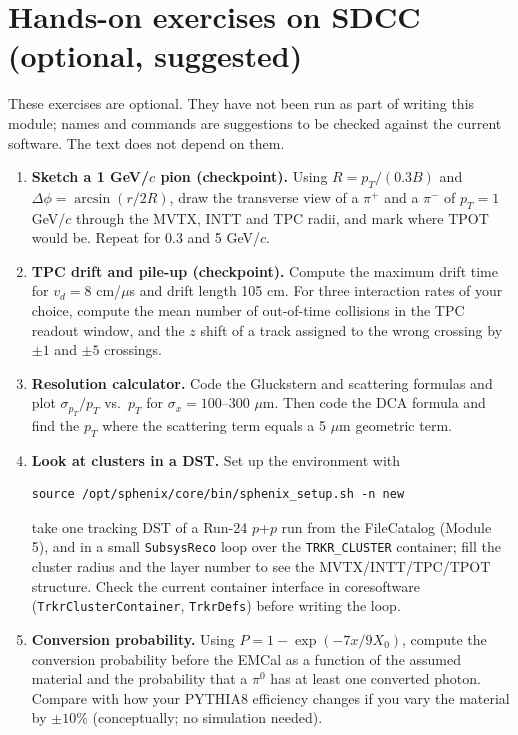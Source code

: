 \documentclass[11pt,letterpaper]{article}
\newcommand{\code}[1]{\texttt{#1}}
\begin{document}
\section{Hands-on exercises on SDCC (optional, suggested)}
These exercises are optional. They have not been run as part of writing this module; names and commands are suggestions to be checked against the current software. The text does not depend on them.
\begin{enumerate}
\item \textbf{Sketch a 1 GeV/$c$ pion (checkpoint).} Using $R=p_T/(0.3B)$ and $\Delta\phi=\arcsin(r/2R)$, draw the transverse view of a $\pi^+$ and a $\pi^-$ of $p_T=1$ GeV/$c$ through the MVTX, INTT and TPC radii, and mark where TPOT would be. Repeat for 0.3 and 5 GeV/$c$.
\item \textbf{TPC drift and pile-up (checkpoint).} Compute the maximum drift time for $v_d=8$ cm/$\mu$s and drift length 105 cm. For three interaction rates of your choice, compute the mean number of out-of-time collisions in the TPC readout window, and the $z$ shift of a track assigned to the wrong crossing by $\pm1$ and $\pm5$ crossings.
\item \textbf{Resolution calculator.} Code the Gluckstern and scattering formulas and plot $\sigma_{p_T}/p_T$ vs.\ $p_T$ for $\sigma_x=100$--300 $\mu$m. Then code the DCA formula and find the $p_T$ where the scattering term equals a 5 $\mu$m geometric term.
\item \textbf{Look at clusters in a DST.} Set up the environment with
\begin{verbatim}
source /opt/sphenix/core/bin/sphenix_setup.sh -n new
\end{verbatim}
take one tracking DST of a Run-24 $p$+$p$ run from the FileCatalog (Module 5), and in a small \code{SubsysReco} loop over the \code{TRKR\_CLUSTER} container; fill the cluster radius and the layer number to see the MVTX/INTT/TPC/TPOT structure. Check the current container interface in coresoftware (\code{TrkrClusterContainer}, \code{TrkrDefs}) before writing the loop.
\item \textbf{Conversion probability.} Using $P=1-\exp(-7x/9X_0)$, compute the conversion probability before the EMCal as a function of the assumed material and the probability that a $\pi^0$ has at least one converted photon. Compare with how your PYTHIA8 efficiency changes if you vary the material by $\pm10\%$ (conceptually; no simulation needed).
\end{enumerate}
\end{document}
